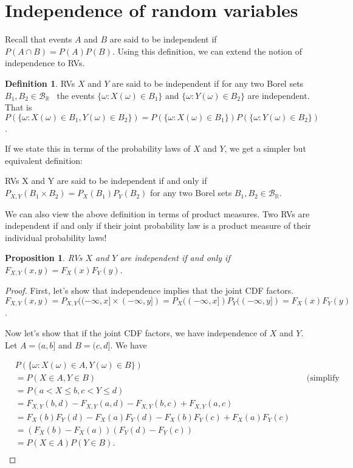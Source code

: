 \documentclass{book}
\theoremstyle{plain}%
\newtheorem{proposition}{Proposition}[section]
\theoremstyle{definition}
\newtheorem{definition}{Definition}[section]
\begin{document}
\section{Independence of random variables}

Recall that events $A$ and $B$ are said to be independent if $P(A \cap B) = P(A)P(B)$. Using this definition, we can extend the notion of independence to RVs.

\begin{definition}
RVs $X$ and $Y$ are said to be independent if for any two Borel sets $B_1, B_2 \in \mathcal{B}_\mathbb{R}$ \ the events $\{\omega: X(\omega) \in B_1\}$ and  $\{\omega: Y(\omega) \in B_2\}$ are independent. That is $P(\{\omega: X(\omega)\in B_1, Y(\omega) \in B_2\}) = P(\{\omega: X(\omega) \in B_1\})P(\{\omega: Y(\omega) \in B_2\})$.

If we state this in terms of the probability laws of $X$ and $Y$, we get a simpler but equivalent definition:

RVs X and Y are said to be independent if and only if $P_{X,Y}(B_1 \times B_2) = P_X(B_1)P_Y(B_2)$ for any two Borel sets $B_1, B_2 \in \mathcal{B}_\mathbb{R}$.
\end{definition}

We can also view the above definition in terms of product measures. Two RVs are independent if and only if their joint probability law is a product measure of their individual probability laws!

\begin{proposition}
RVs $X$ and $Y$ are independent if and only if $F_{X,Y}(x,y) = F_X(x)F_Y(y)$.\label{prop:indep2}
\end{proposition}

\begin{proof}
First, let's show that independence implies that the joint CDF factors. $F_{X,Y}(x,y) = P_{X,Y}((-\infty,x] \times (-\infty,y]) = P_X((-\infty,x])P_Y((-\infty,y]) = F_X(x)F_Y(y)$.

Now let's show that if the joint CDF factors, we have independence of $X$ and $Y$. Let $A = (a, b]$ and $B = (c, d]$. We have 

\begin{align*}
& P(\{\omega: X(\omega) \in A, Y(\omega) \in B\})  \\
&= P(X \in A, Y \in B) && \text{ (simplify notation)} \\
&= P(a < X \leq b, c < Y \leq d) \\
&= F_{X,Y}(b, d) - F_{X,Y}(a, d) - F_{X,Y}(b, c)  + F_{X,Y}(a, c) \\
&= F_X(b)F_Y(d) - F_X(a)F_Y(d) - F_X(b)F_Y(c)   + F_X(a)F_Y(c) \\
&= (F_X(b) - F_X(a))(F_Y(d) - F_Y(c)) \\
&= P(X \in A)P(Y \in B).\\
\end{align*}
\end{proof}
\end{document}
